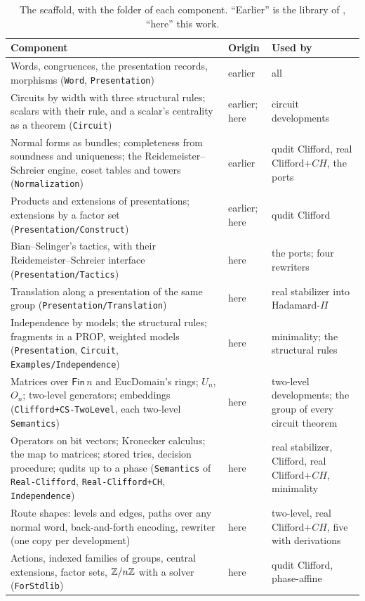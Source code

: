 \begin{table}[h]
\caption{The scaffold, with the folder of each component. ``Earlier''
is the library of \citet{anonymous2027popl}, ``here'' this work.}
\label{tab:scaffold}
\footnotesize
\setlength{\tabcolsep}{4pt}
\begin{tabularx}{\linewidth}{@{}Y l Y@{}}
\toprule
Component & Origin & Used by \\
\midrule
Words, congruences, the presentation records, morphisms (\texttt{Word}, \texttt{Presentation}) & earlier & all \\
Circuits by width with three structural rules; scalars with their rule, and a scalar's centrality as a theorem (\texttt{Circuit}) & earlier; here & circuit developments \\
Normal forms as bundles; completeness from soundness and uniqueness; the Reidemeister--Schreier engine, coset tables and towers (\texttt{Normalization}) & earlier & qudit Clifford, real Clifford+$CH$, the ports \\
Products and extensions of presentations; extensions by a factor set (\texttt{Presentation/\allowbreak Construct}) & earlier; here & qudit Clifford \\
Bian--Selinger's tactics, with their Reidemeister--Schreier interface (\texttt{Presentation/\allowbreak Tactics}) & here & the ports; four rewriters \\
Translation along a presentation of the same group (\texttt{Presentation/\allowbreak Translation}) & here & real stabilizer into Hadamard-$\Pi$ \\
Independence by models; the structural rules; fragments in a PROP, weighted models (\texttt{Presentation}, \texttt{Circuit}, \texttt{Examples/\allowbreak Independence}) & here & minimality; the structural rules \\
Matrices over $\mathsf{Fin}\,n$ and EucDomain's rings; $U_n$, $O_n$; two-level generators; embeddings (\texttt{Clifford+CS-\allowbreak TwoLevel}, each two-level \texttt{Semantics}) & here & two-level developments; the group of every circuit theorem \\
Operators on bit vectors; Kronecker calculus; the map to matrices; stored tries, decision procedure; qudits up to a phase (\texttt{Semantics} of \texttt{Real-Clifford}, \texttt{Real-Clifford+CH}, \texttt{Independence}) & here & real stabilizer, Clifford, real Clifford+$CH$, minimality \\
Route shapes: levels and edges, paths over any normal word, back-and-forth encoding, rewriter (one copy per development) & here & two-level, real Clifford+$CH$, five with derivations \\
Actions, indexed families of groups, central extensions, factor sets, $\mathbb{Z}/n\mathbb{Z}$ with a solver (\texttt{ForStdlib}) & here & qudit Clifford, phase-affine \\
\bottomrule
\end{tabularx}
\end{table}

